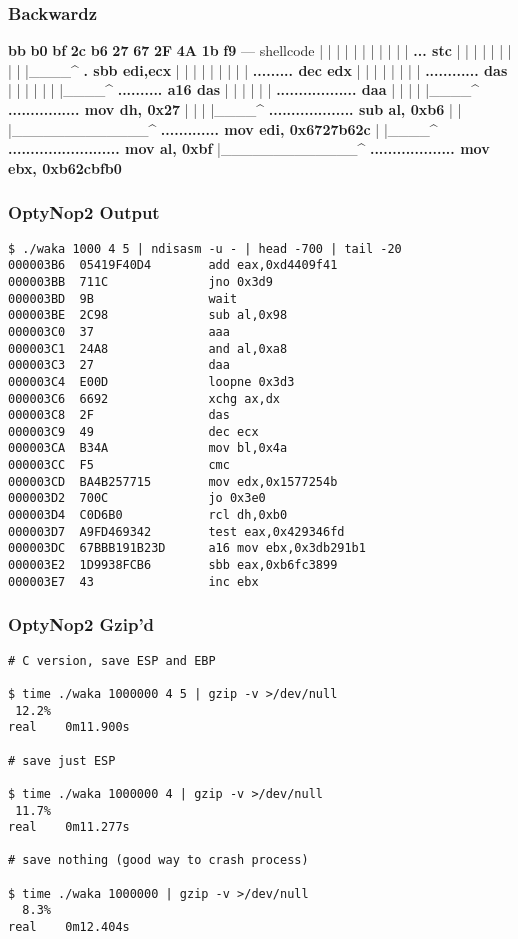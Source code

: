 \documentclass{beamer}
\begin{document}
\begin{frame}[fragile]
  \frametitle{Backwardz}
  {\footnotesize
  \begin{semiverbatim}
  \textbf<11>{bb} \textbf<10,11>{b0} \textbf<9,10,11>{bf} \textbf<8,9,11>{2c} \textbf<7,8,9,11>{b6} \textbf<6,7,9>{27} \textbf<5,9>{67} \textbf<4,5>{2F} \textbf<3>{4A} \textbf<2>{1b} \textbf<1,2>{f9} --- shellcode
  |  |  |  |  |  |  |  |  |  |  | \textbf<1>{... stc}
  |  |  |  |  |  |  |  |  |  |____^ \textbf<2>{. sbb edi,ecx}
  |  |  |  |  |  |  |  |  | \textbf<3>{......... dec edx}
  |  |  |  |  |  |  |  | \textbf<4>{............ das}
  |  |  |  |  |  |  |____^ \textbf<5>{.......... a16 das}
  |  |  |  |  |  | \textbf<6>{.................. daa}
  |  |  |  |  |____^ \textbf<7>{................ mov dh, 0x27}
  |  |  |  |____^ \textbf<8>{................... sub al, 0xb6}
  |  |  |_____________^ \textbf<9>{............. mov edi, 0x6727b62c}
  |  |____^ \textbf<10>{......................... mov al, 0xbf}
  |_____________^ \textbf<11>{................... mov ebx, 0xb62cbfb0}
\end{semiverbatim}
}
\end{frame}

\begin{frame}[fragile]
  \frametitle{OptyNop2 Output}
  {\footnotesize
  \begin{verbatim}
$ ./waka 1000 4 5 | ndisasm -u - | head -700 | tail -20
000003B6  05419F40D4        add eax,0xd4409f41
000003BB  711C              jno 0x3d9
000003BD  9B                wait
000003BE  2C98              sub al,0x98
000003C0  37                aaa
000003C1  24A8              and al,0xa8
000003C3  27                daa
000003C4  E00D              loopne 0x3d3
000003C6  6692              xchg ax,dx
000003C8  2F                das
000003C9  49                dec ecx
000003CA  B34A              mov bl,0x4a
000003CC  F5                cmc
000003CD  BA4B257715        mov edx,0x1577254b
000003D2  700C              jo 0x3e0
000003D4  C0D6B0            rcl dh,0xb0
000003D7  A9FD469342        test eax,0x429346fd
000003DC  67BBB191B23D      a16 mov ebx,0x3db291b1
000003E2  1D9938FCB6        sbb eax,0xb6fc3899
000003E7  43                inc ebx
\end{verbatim}
}
\end{frame}


\begin{frame}[fragile]
  \frametitle{OptyNop2 Gzip'd}
  {\footnotesize
  \begin{verbatim}
# C version, save ESP and EBP

$ time ./waka 1000000 4 5 | gzip -v >/dev/null
 12.2%
real    0m11.900s

# save just ESP

$ time ./waka 1000000 4 | gzip -v >/dev/null
 11.7%
real    0m11.277s

# save nothing (good way to crash process)

$ time ./waka 1000000 | gzip -v >/dev/null
  8.3%
real    0m12.404s
\end{verbatim}
}
\end{frame}
\end{document}
